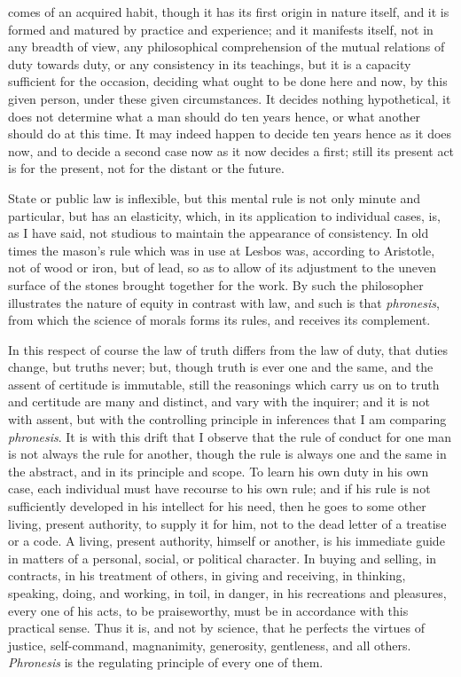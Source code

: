 comes of an acquired habit, though it has its first origin in nature
itself, and it is formed and matured by practice and experience;
and it manifests itself, not in any breadth of view, any philosophical
comprehension of the mutual relations of duty towards duty, or any
consistency in its teachings, but it is a capacity sufficient for the
occasion, deciding what ought to be done here and now, by this given
person, under these given circumstances. It decides nothing
hypothetical, it does not determine what a man should do ten years
hence, or what another should do at this time. It may indeed happen to
decide ten years hence as it does now, and to decide a second case now
as it now decides a first; still its present act is for the present,
not for the distant or the future.

State or public law is inflexible, but this mental rule is not only
minute and particular, but has an elasticity, which, in its
application to individual cases, is, as I have said, not studious to
maintain the appearance of consistency. In old times the mason's rule
which was in use at Lesbos was, according to Aristotle, not of wood or
iron, but of lead, so as to allow of its adjustment to the uneven
surface of the stones brought together for the work. By such the
philosopher illustrates the nature of equity in contrast with law, and
such is that \emph{phronesis}, from which the science of morals forms
its rules, and receives its complement.

In this respect of course the law of truth differs from the law of
duty, that duties change, but truths never; but, though truth is ever
one and the same, and the assent of certitude is immutable, still the
reasonings which carry us on to truth and certitude are many and
distinct, and vary with the inquirer; and it is not with assent,
but with the controlling principle in inferences that I am comparing \emph{phronesis}.
It is with this drift that I observe that the rule of conduct for one
man is not always the rule for another, though the rule is always one
and the same in the abstract, and in its principle and scope. To learn
his own duty in his own case, each individual must have recourse to
his own rule; and if his rule is not sufficiently developed in his
intellect for his need, then he goes to some other living, present
authority, to supply it for him, not to the dead letter of a treatise
or a code. A living, present authority, himself or another, is his
immediate guide in matters of a personal, social, or political
character. In buying and selling, in contracts, in his treatment of
others, in giving and receiving, in thinking, speaking, doing, and
working, in toil, in danger, in his recreations and pleasures, every
one of his acts, to be praiseworthy, must be in accordance with this
practical sense. Thus it is, and not by science, that he perfects the
virtues of justice, self-command, magnanimity, generosity, gentleness,
and all others. \emph{Phronesis} is the regulating principle of every
one of them.

